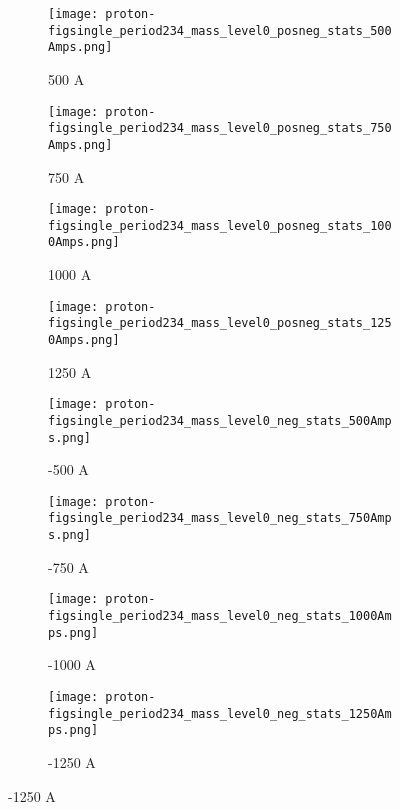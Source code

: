  \begin{figure}[h]	
 \centering   
            \begin{subfigure}[b]{0.24\textwidth}
            \centering
            \texttt{[image: proton-figsingle\_period234\_mass\_level0\_posneg\_stats\_500Amps.png]}
            \caption{500 A}
            \label{fig_mproton500}
            \end{subfigure}
             \hfill   
            \begin{subfigure}[b]{0.24\textwidth}
            \centering
            \texttt{[image: proton-figsingle\_period234\_mass\_level0\_posneg\_stats\_750Amps.png]}
            \caption{750 A}
            \label{fig_mproton750}
            \end{subfigure}
             \hfill   
            \begin{subfigure}[b]{0.24\textwidth}
            \centering
            \texttt{[image: proton-figsingle\_period234\_mass\_level0\_posneg\_stats\_1000Amps.png]}
            \caption{1000 A}
            \label{fig_mproton1000}
            \end{subfigure}
             \hfill                             
             \begin{subfigure}[b]{0.24\textwidth}
            \centering
            \texttt{[image: proton-figsingle\_period234\_mass\_level0\_posneg\_stats\_1250Amps.png]}
            \caption{1250 A}
            \label{fig_mproton1250}
            \end{subfigure}
            
                        \begin{subfigure}[b]{0.24\textwidth}
            \centering
            \texttt{[image: proton-figsingle\_period234\_mass\_level0\_neg\_stats\_500Amps.png]}
            \caption{-500 A}
            \label{fig_mproton-500}
            \end{subfigure}
             \hfill   
            \begin{subfigure}[b]{0.24\textwidth}
            \centering
            \texttt{[image: proton-figsingle\_period234\_mass\_level0\_neg\_stats\_750Amps.png]}
            \caption{-750 A}
            \label{fig_mproton-750}
            \end{subfigure}
             \hfill   
            \begin{subfigure}[b]{0.24\textwidth}
            \centering
            \texttt{[image: proton-figsingle\_period234\_mass\_level0\_neg\_stats\_1000Amps.png]}
            \caption{-1000 A}
            \label{fig_mproton-1000}
            \end{subfigure}
             \hfill                             
             \begin{subfigure}[b]{0.24\textwidth}
            \centering
            \texttt{[image: proton-figsingle\_period234\_mass\_level0\_neg\_stats\_1250Amps.png]}
            \caption{-1250 A}
            \label{fig_mproton-1250}
            \end{subfigure}
            

\end{figure}
